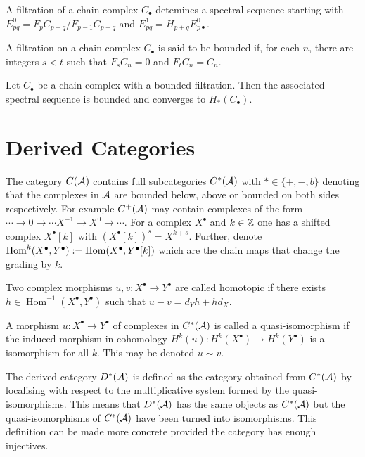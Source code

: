 \begin{proposition}
 A filtration of a chain complex $C_\bullet$ detemines a spectral sequence starting with $E_{pq}^0 = F_p C_{p+q}/F_{p-1}C_{p+q}$ and $E_{pq}^1= H_{p+q} E_{p\bullet}^0$.
\end{proposition}
\begin{definition}
  A filtration on a chain complex $C_\bullet$ is said to be bounded
 if, for each $n$, there are integers $s<t$ such that $F_s C_n = 0$ and $F_t C_n = C_n$. \end{definition}
 \begin{proposition}
   Let $C_\bullet$ be a chain complex with a bounded filtration. Then the associated spectral sequence is bounded and converges to $H_*(C_\bullet)$.
 \end{proposition}
\section{Derived Categories}
The category $C(\AA)$ contains full subcategories $C^*(\AA)$ with $*\in \{ +, -, b\}$ denoting that the complexes in $\AA$ are bounded below, above or bounded on both sides respectively.
For example $C^+(\AA)$ may contain complexes of the form $\cdots \to 0\to \cdots X^{-1} \to X^0 \to \cdots$.
For a complex $X^\bullet$ and $k\in \Z$ one has a shifted complex $X^\bullet[k]$ with $(X^\bullet[k])^s = X^{k+s}$.
Further, denote $\operatorname{Hom}^k(X^\bullet, Y^\bullet) :=  \op{Hom}(X^\bullet, Y^\bullet[k])$ which are the chain maps that change the grading by $k$.
\begin{definition}
 Two complex morphisms $u,v:X^\bullet\to Y^\bullet$ are called homotopic if there exists $h\in \operatorname{Hom}^{-1}(X^\bullet, Y^\bullet)$ such that $u-v = d_Y h + hd_X$.
\end{definition}
\begin{definition}
 A morphism $u:X^\bullet\to Y^\bullet$  of complexes in $C^*(\AA)$ is called a quasi-isomorphism if the induced morphism in cohomology $H^k(u):H^k(X^\bullet) \to H^k(Y^\bullet)$ is a isomorphism for all $k$. This may be denoted $u\sim v$.
\end{definition}
The derived category $D^*(\AA)$ is defined as the category obtained from $C^*(\AA)$ by localising with respect to the multiplicative system formed by the quasi-isomorphisms.
This means that $D^*(\AA)$ has the same objects as $C^*(\AA)$ but the quasi-isomorphisms of $C^*(\AA)$ have been turned into isomorphisms.
This definition can be made more concrete provided the category has enough injectives.
